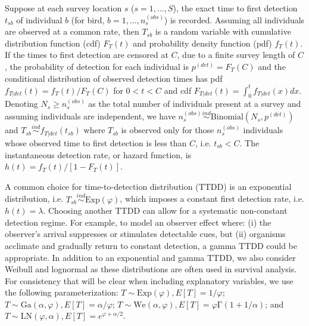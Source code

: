 \documentclass[useAMS,usenatbib,referee,12pt]{article}
\newcommand{\Exp}{\mbox{Exp}}
\newcommand{\Ga}{\mbox{Ga}}
\newcommand{\We}{\mbox{We}}
\newcommand{\LN}{\mbox{LN}}
\begin{document}
Suppose at each survey location $s$ ($s=1,\dots,S$), the exact time to first detection $t_{sb}$ of individual $b$ (for bird, $b=1,\dots,n_s^{(obs)}$) is recorded.
Assuming all individuals are observed at a common rate, then $T_{sb}$ is a random variable with cumulative distribution function (cdf) $F_T(t)$ and probability density function (pdf) $f_T(t)$. 
If the times to first detection are censored at $C$, due to a finite survey length of $C$, the probability of detection for each individual is $p^{(det)}=F_T(C)$ and the conditional distribution of observed detection times has pdf $f_{T|det}(t)= f_T(t)/F_T(C)$ for $0<t<C$ and cdf $F_{T|det}(t) = \int_0^t f_{T|det}(x) dx$. Denoting $N_{s}\ge n_s^{(obs)}$ as the total number of individuals present at a survey and assuming individuals are independent, we have $n_{s}^{(obs)} \stackrel{ind}{\sim} \mbox{Binomial}\left(N_{s}, p^{(det)}\right)$ and $T_{sb} \stackrel{ind}{\sim} f_{T|det}(t_{sb})$
where $T_{sb}$ is observed only for those $n_s^{(obs)}$ individuals whose observed time to first detection is less than $C$, i.e. $t_{sb}<C$. 
The instantaneous detection rate, or hazard function, is $h(t) = f_T(t) / [1-F_T(t)]$.

A common choice for time-to-detection distribution (TTDD) is an exponential distribution, i.e. $T_{sb}\stackrel{ind}{\sim} \mbox{Exp}(\varphi)$, which imposes a constant first detection rate, i.e. $h(t) = \lambda$.
Choosing another TTDD can allow for a systematic non-constant detection regime. 
For example, to model an observer effect where: (i) the observer's arrival suppresses or stimulates detectable cues, but (ii) organisms acclimate and gradually return to constant detection, a gamma TTDD could be appropriate.
In addition to an exponential and gamma TTDD, we also consider Weibull and lognormal as these distributions are often used in survival analysis. 
For consistency that will be clear when including explanatory variables, we use the following parameterization: $T\sim \Exp(\varphi), E[T]=1/\varphi$; $T\sim \Ga(\alpha,\varphi), E[T] = \alpha/\varphi$; $T\sim \We(\alpha,\varphi), E[T]=\varphi \mathrm{\Gamma}(1+1/\alpha)$; and $T\sim \LN(\varphi,\alpha), E[T] = e^{\varphi+\alpha/2}$.
\end{document}
